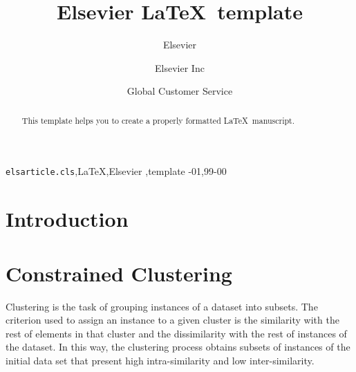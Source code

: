 \documentclass[review]{elsarticle}
\begin{document}
\begin{frontmatter}

\title{Elsevier \LaTeX\ template}

\author{Elsevier}
\address{Radarweg 29, Amsterdam}

\author[mymainaddress,mysecondaryaddress]{Elsevier Inc}

\author[mysecondaryaddress]{Global Customer Service}

\address[mymainaddress]{1600 John F Kennedy Boulevard, Philadelphia}
\address[mysecondaryaddress]{360 Park Avenue South, New York}

\begin{abstract}
This template helps you to create a properly formatted \LaTeX\ manuscript.
\end{abstract}

\begin{keyword}
\texttt{elsarticle.cls}\sep \LaTeX\sep Elsevier \sep template
-01\sep  99-00
\end{keyword}

\end{frontmatter}

\linenumbers

\section{Introduction}

\section{Constrained Clustering}

Clustering is the task of grouping instances of a dataset into subsets. The criterion used to assign an instance to a given cluster is the similarity with the rest of elements in that cluster and the dissimilarity with the rest of instances of the dataset. In this way, the clustering process obtains subsets of instances of the initial data set that present high intra-similarity and low inter-similarity.
\end{document}
